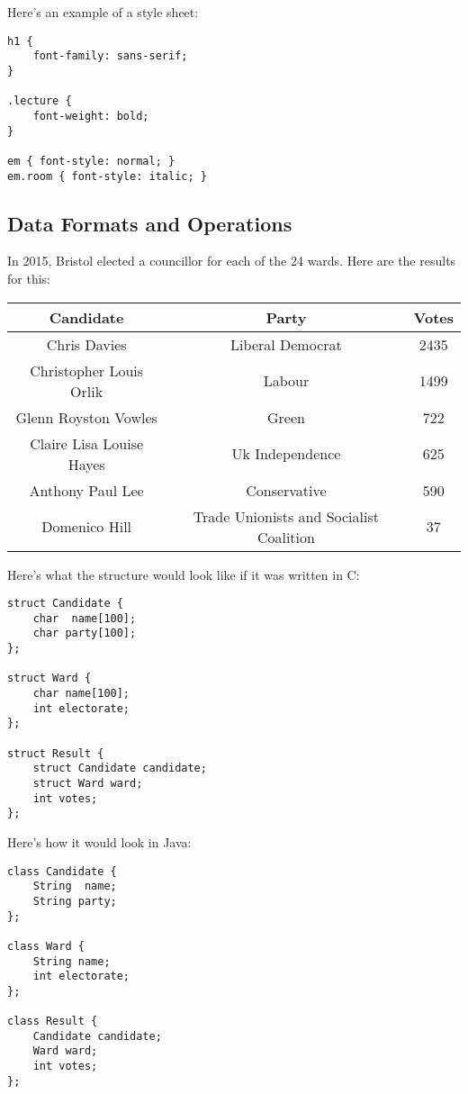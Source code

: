 \documentclass[11pt,a4paper,titlepage,dvipsnames,cmyk]{scrartcl}
\begin{document}
Here's an example of a style sheet:
\begin{lstlisting}[]
h1 {
    font-family: sans-serif;
}

.lecture {
    font-weight: bold;
}

em { font-style: normal; }
em.room { font-style: italic; }
\end{lstlisting}

\subsection{Data Formats and Operations}%
\label{sub:Data Formats and Operations}
In 2015, Bristol elected a councillor for each of the 24 wards. Here are
the results for this:
\begin{center}
    \begin{tabular}{|c|c|c|}
        \hline
        \textbf{Candidate} & \textbf{Party} & \textbf{Votes} \\
        \hline
        Chris Davies & Liberal Democrat & 2435 \\
        \hline
        Christopher Louis Orlik & Labour & 1499 \\
        \hline
        Glenn Royston Vowles & Green & 722 \\
        \hline
        Claire Lisa Louise Hayes & Uk Independence & 625 \\
        \hline
        Anthony Paul Lee & Conservative & 590 \\
        \hline
        Domenico Hill & Trade Unionists and Socialist Coalition & 37 \\
        \hline
    \end{tabular}
\end{center}

Here's what the structure would look like if it was written in C:
\begin{lstlisting}[]
struct Candidate {
    char  name[100];
    char party[100];
};

struct Ward {
    char name[100];
    int electorate;
};

struct Result {
    struct Candidate candidate;
    struct Ward ward;
    int votes;
};
\end{lstlisting}

Here's how it would look in Java:
\begin{lstlisting}[]
class Candidate {
    String  name;
    String party;
};

class Ward {
    String name;
    int electorate;
};

class Result {
    Candidate candidate;
    Ward ward;
    int votes;
};
\end{lstlisting}
\end{document}
